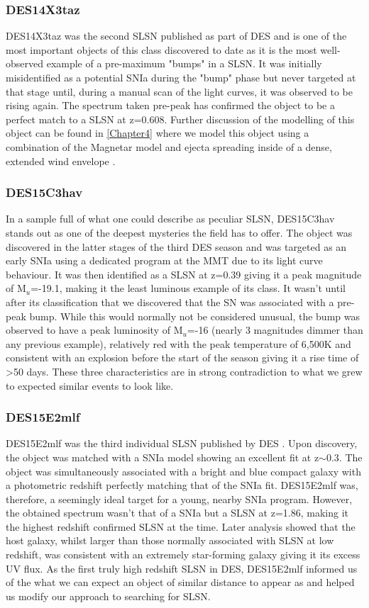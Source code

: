 \subsubsection{DES14X3taz}
DES14X3taz was the second SLSN published as part of DES and is one of the most important objects of this class discovered to date as it is the most well-observed example of a pre-maximum "bumps" in a SLSN. It was initially misidentified as a potential SNIa during the "bump" phase but never targeted at that stage until, during a manual scan of the light curves, it was observed to be rising again. The spectrum taken pre-peak has confirmed the object to be a perfect match to a SLSN at z=0.608. Further discussion of the modelling of this object can be found in \cref{Chapter4} where we model this object using a combination of the Magnetar model and ejecta spreading inside of a dense, extended wind envelope \citep{Piro2015}.

\subsubsection{DES15C3hav}
In a sample full of what one could describe as peculiar SLSN, DES15C3hav stands out as one of the deepest mysteries the field has to offer. The object was discovered in the latter stages of the third DES season and was targeted as an early SNIa using a dedicated program at the MMT due to its light curve behaviour. It was then identified as a SLSN at z=0.39 giving it a peak magnitude of M$_u$=-19.1, making it the least luminous example of its class. It wasn't until after its classification that we discovered that the SN was associated with a pre-peak bump. While this would normally not be considered unusual, the bump was observed to have a peak luminosity of M$_u$=-16 (nearly 3 magnitudes dimmer than any previous example), relatively red with the peak temperature of 6,500K and consistent with an explosion before the start of the season giving it a rise time of >50 days. These three characteristics are in strong contradiction to what we grew to expected similar events to look like.

\subsubsection{DES15E2mlf}
DES15E2mlf was the third individual SLSN published by DES \citep{Pan2017}. Upon discovery, the object was matched with a SNIa model showing an excellent fit at z$\sim$0.3. The object was simultaneously associated with a bright and blue compact galaxy with a photometric redshift perfectly matching that of the SNIa fit. DES15E2mlf was, therefore, a seemingly ideal target for a young, nearby SNIa program. However, the obtained spectrum wasn't that of a SNIa but a SLSN at z=1.86, making it the highest redshift confirmed SLSN at the time. Later analysis showed that the host galaxy, whilst larger than those normally associated with SLSN at low redshift, was consistent with an extremely star-forming galaxy giving it its excess UV flux. As the first truly high redshift SLSN in DES, DES15E2mlf informed us of the what we can expect an object of similar distance to appear as and helped us modify our approach to searching for SLSN.

